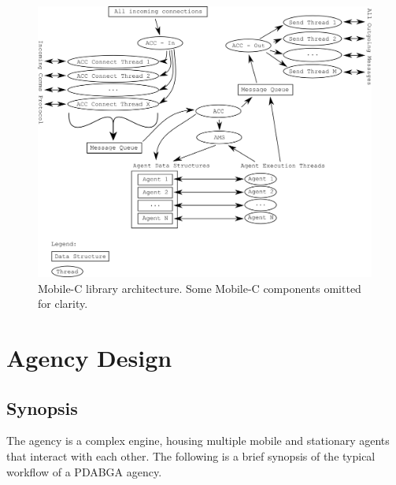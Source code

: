       \begin{figure}[!ht]
      \begin{center}
         \includegraphics[width=5in]{figures/mobilec_architecture}
      \end{center}
      \caption{\label{fig:mobilec_architecture}Mobile-C library architecture.
        Some Mobile-C components omitted for clarity.}
      \end{figure}



  \section{Agency Design} %
    \subsection{Synopsis} %
      The agency is a complex engine, housing multiple mobile and stationary
        agents that interact with each other. 
      The following is a brief synopsis of the typical workflow of a PDABGA
        agency. 
      
